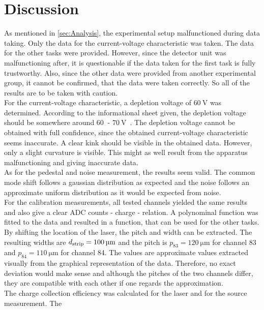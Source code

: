 \section{Discussion}
\label{sec:Discussion}
As mentioned in \autoref{sec:Analysis}, the experimental setup malfunctioned during data taking. Only
the data for the current-voltage characteristic was taken. The data for the other tasks were provided. However,
since the detector unit was malfunctioning after, it is questionable if the data taken for the first task is 
fully trustworthy. Also, since the other data were provided from another experimental group, it cannot be
confirmed, that the data were taken correctly. So all of the results are to be taken with caution.\\
For the current-voltage characteristic, a depletion voltage of $\qty{60}{\volt}$ was determined. According to the
informational sheet given, the depletion voltage should be somewhere around $\qty{60}{}$ - $\qty{70}{\volt}$~\cite{SiliconStrip}.
The depletion voltage cannot be obtained with full confidence, since the obtained current-voltage characteristic
seems inaccurate. A clear kink should be visible in the obtained data. However, only a slight curvature is visible.
This might as well result from the apparatus malfunctioning and giving inaccurate data.\\
As for the pedestal and noise measurement, the results seem valid. The common mode shift follows a gaussian distribution
as expected and the noise follows an approximate uniform distribution as it would be expected from noise.\\
For the calibration measurements, all tested channels yielded the same results and also give a clear ADC counts - charge - relation.
A polynominal function was fitted to the data and
resulted in a function, that can be used for the other tasks.\\
By shifting the location of the laser, the pitch and width can be extracted. The resulting widths are $d_{\mathrm{strip}} = \qty{100 \pm 0}{\micro\metre}$
and the pitch is $p_{83} = \qty{120}{\micro\metre}$ for channel 83 and $p_{84} = \qty{110}{\micro\metre}$ for channel 84.
The values are approximate values extracted visually from the graphical representation of the data. Therefore, no exact
deviation would make sense and although the pitches of the two channels differ, they are compatible with each
other if one regards the approximation.\\
The charge collection efficiency was calculated for the laser and for the source measurement. The
